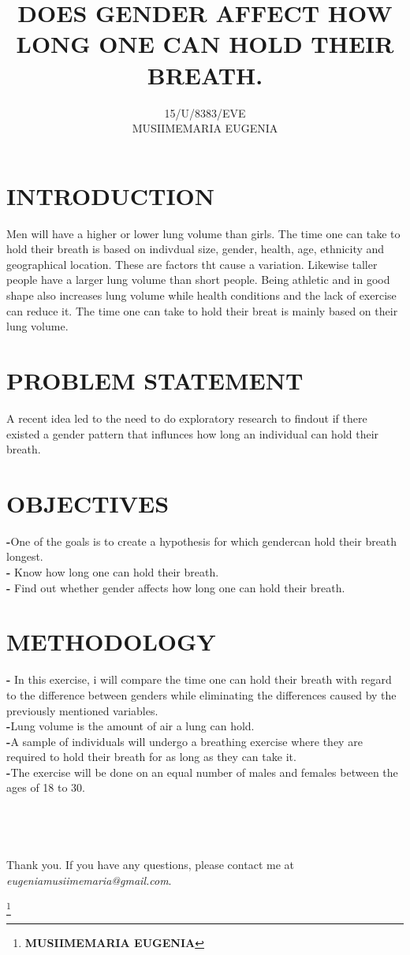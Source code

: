 \documentclass[12pt, letterpaper]{article}
\begin{document}
\title{\textbf{ DOES GENDER AFFECT HOW LONG ONE CAN HOLD THEIR
	BREATH.}}
\author{15/U/8383/EVE \\ MUSIIMEMARIA EUGENIA }
 \date{}
\maketitle 
\section{\textbf{INTRODUCTION} } 
Men will have a higher or lower lung volume than girls. The time
 one can take to hold their breath is based on indivdual size, gender, health,
age, ethnicity and geographical location. These are factors tht cause a
variation. Likewise taller people have a larger lung volume than short people.
Being athletic and in good shape also increases lung volume while health
conditions and the lack of exercise can reduce it. The time
one can take to hold their breat is mainly based on their lung volume.

\section{\textbf{PROBLEM STATEMENT} } 
 A recent idea led to the need to do exploratory research
to findout if there existed a gender pattern that influnces how long an individual
can hold their breath.

\section{\textbf{OBJECTIVES} } 
\textbf{-}One of the goals is to create a hypothesis for which gendercan hold their breath longest.\\
\textbf{-} Know how long one can hold their breath.\\
\textbf{-} Find out whether gender affects how long one can hold their breath.

\section{\textbf{METHODOLOGY} } 
\textbf{-} In this exercise, i will compare the time one can hold their breath with regard to the difference between genders while eliminating the differences caused by the previously mentioned variables.\\ 
\textbf{-}Lung volume is the amount of air a lung can hold.\\
\textbf{-}A sample of individuals will undergo a breathing exercise where they are
required to hold their breath for as long as they can take it.\\
\textbf{-}The exercise will be done on an equal number of males and females between the ages of 18 to 30.\\ \\ \\ \\ \\

Thank you. If you have any questions, please contact me at \emph{eugeniamusiimemaria@gmail.com}.

\footnote{\textbf{ MUSIIMEMARIA EUGENIA}}
\end{document}
